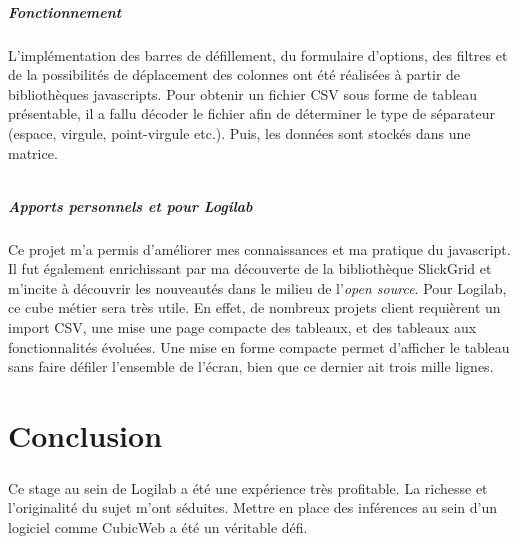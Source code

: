 \documentclass {report}
\begin{document}
\paragraph{Fonctionnement}
L'implémentation des barres de défillement, du formulaire d'options, des filtres et de la possibilités de déplacement des colonnes ont été réalisées à partir de bibliothèques javascripts. Pour obtenir un fichier CSV sous forme de tableau présentable, il a fallu décoder le fichier afin de déterminer le type de séparateur (espace, virgule, point-virgule etc.). Puis, les données sont stockés dans une matrice.

\begin{lstlisting}[caption= code à insérer]
\end{lstlisting}


\paragraph{Apports personnels et pour Logilab}
Ce projet m'a permis d'améliorer mes connaissances et ma pratique du javascript\footnotemark[1]. Il fut également enrichissant par ma découverte de la bibliothèque SlickGrid et m'incite à découvrir les nouveautés dans le milieu de l'\textit{open source}. Pour Logilab, ce cube métier sera très utile. En effet, de nombreux projets client requièrent un import CSV, une mise une page compacte des tableaux, et des tableaux aux fonctionnalités évoluées. Une mise en forme compacte permet d'afficher le tableau sans faire défiler l'ensemble de l'écran, bien que ce dernier ait trois mille lignes.



\chapter{Conclusion}
\paragraph{}
Ce stage au sein de Logilab a été une expérience très profitable. La richesse et l'originalité du sujet m'ont séduites. Mettre en place des inférences au sein d'un logiciel comme CubicWeb a été un véritable défi. 
\end{document}
